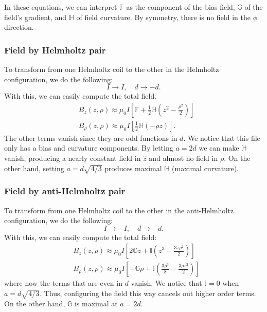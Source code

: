 \documentclass{article}
\theoremstyle{definition}
\newcommand{\f}[2]{\frac{#1}{#2}}
\newcommand{\lp}{\left(}
\newcommand{\rp}{\right)}
\newcommand{\lb}{\left[}
\newcommand{\rb}{\right]}
\begin{document}
In these equations, we can interpret $\mathbb{F}$ as the component of the bias field, $\mathbb{G}$ of the field's gradient, and $\mathbb{H}$ of field curvature.  By symmetry, there is no field in the $\phi$ direction. 


\subsubsection{Field by Helmholtz pair}
To transform from one Helmholtz coil to the other in the Helmholtz configuration, we do the following:
\begin{equation*}
I \to I, \quad d \to -d.
\end{equation*}
With this, we can easily compute the total field.  
\begin{align*}
&B_z(z,\rho) \approx \mu_0 I \lb \mathbb{F} + \f{1}{2}\mathbb{H} \lp z^2 - \f{\rho^2}{2} \rp  \rb\\
&B_\rho(z,\rho) \approx \mu_0 I \lb \f{1}{2}\mathbb{H}(-\rho z) \rb.
\end{align*}
The other terms vanish since they are odd functions in $d$. We notice that this file only has a bias and curvature components. By letting $a=2d$ we can make  $\mathbb{H}$ vanish, producing a nearly constant field in $\hat{z}$ and almost no field in $\rho$. On the other hand, setting $a = d\sqrt{4/3}$ produces maximal $\mathbb{H}$ (maximal curvature). 



\subsubsection{Field by anti-Helmholtz pair}

To transform from one Helmholtz coil to the other in the anti-Helmholtz configuration, we do the following:
\begin{equation*}
I \to -I, \quad d \to -d.
\end{equation*}
With this, we can easily compute the total field:
\begin{align*}
&B_z(z,\rho) \approx  \mu_0 I \lb 2\mathbb{G}z + \mathbb{I}\lp z^3 - \f{3z\rho^2}{2} \rp \rb\\
&B_\rho(z,\rho) \approx \mu_0 I \lb -\mathbb{G}\rho + \mathbb{I}\lp \f{3\rho^3}{8} - \f{3\rho z^2}{2} \rp \rb
\end{align*}
where now the terms that are even in $d$ vanish. We notice that $\mathbb{I} = 0$ when $a = d\sqrt{4/3}$. Thus, configuring the field this way cancels out higher order terms. On the other hand, $\mathbb{G}$ is maximal at $a = 2d$. 
\end{document}
